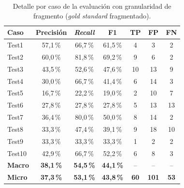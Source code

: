 \begin{table}[htbp]
    \centering
    \caption{Detalle por caso de la evaluación  con granularidad de fragmento
    (\textit{gold standard} fragmentado).}
    \label{tab:ner_detalle_granular}
    \begin{tabular}{@{}lcccccc@{}}
    \toprule
    \textbf{Caso} & \textbf{Precisión} & \textbf{\textit{Recall}} & \textbf{F1} & \textbf{TP} & \textbf{FP} & \textbf{FN} \\
    \midrule
    Test1  & 57,1\,\% & 66,7\,\% & 61,5\,\% & 4 & 3  & 2  \\
    Test2  & 60,0\,\% & 81,8\,\% & 69,2\,\% & 9 & 6  & 2  \\
    Test3  & 43,5\,\% & 52,6\,\% & 47,6\,\% & 10 & 13 & 9 \\
    Test4  & 30,0\,\% & 66,7\,\% & 41,4\,\% & 6 & 14 & 3 \\
    Test5  & 16,7\,\% & 22,2\,\% & 19,0\,\% & 2 & 10 & 7 \\
    Test6  & 27,8\,\% & 27,8\,\% & 27,8\,\% & 5 & 13 & 13 \\
    Test7  & 36,4\,\% & 80,0\,\% & 50,0\,\% & 8 & 14 & 2 \\
    Test8  & 33,3\,\% & 47,4\,\% & 39,1\,\% & 9 & 18 & 10 \\
    Test9  & 33,3\,\% & 33,3\,\% & 33,3\,\% & 1 & 2  & 2 \\
    Test10 & 42,9\,\% & 66,7\,\% & 52,2\,\% & 6 & 8  & 3 \\
    \midrule
    \textbf{Macro} & \textbf{38,1\,\%} & \textbf{54,5\,\%} & \textbf{44,1\,\%} & -- & -- & -- \\
    \textbf{Micro} & \textbf{37,3\,\%} & \textbf{53,1\,\%} & \textbf{43,8\,\%} & \textbf{60} & \textbf{101} & \textbf{53} \\
    \bottomrule
    \end{tabular}
\end{table}
